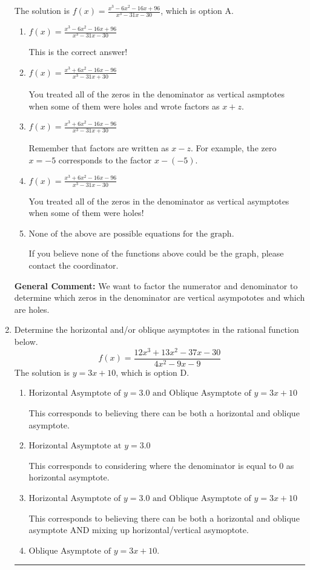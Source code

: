 \documentclass{extbook}[14pt]
\newcommand{\litem}[1]{\item #1

\rule{\textwidth}{0.4pt}}
\begin{document}
\begin{enumerate}
{The solution is \( f(x)=\frac{x^{3} -6 x^{2} -16 x + 96}{x^{3} -31 x -30} \), which is option A.\begin{enumerate}[label=\Alph*.]
\item \( f(x)=\frac{x^{3} -6 x^{2} -16 x + 96}{x^{3} -31 x -30} \)

This is the correct answer!
\item \( f(x)=\frac{x^{3} +6 x^{2} -16 x -96}{x^{3} -31 x + 30} \)

You treated all of the zeros in the denominator as vertical asmptotes when some of them were holes and wrote factors as $x+z$.
\item \( f(x)=\frac{x^{3} +6 x^{2} -16 x -96}{x^{3} -31 x + 30} \)

Remember that factors are written as $x-z$. For example, the zero $x=-5$ corresponds to the factor $x-(-5)$.
\item \( f(x)=\frac{x^{3} +6 x^{2} -16 x -96}{x^{3} -31 x -30} \)

You treated all of the zeros in the denominator as vertical asymptotes when some of them were holes!
\item \( \text{None of the above are possible equations for the graph.} \)

If you believe none of the functions above could be the graph, please contact the coordinator.
\end{enumerate}

\textbf{General Comment:} We want to factor the numerator and denominator to determine which zeros in the denominator are vertical asympototes and which are holes.
}
\litem{
Determine the horizontal and/or oblique asymptotes in the rational function below.
\[ f(x) = \frac{12x^{3} +13 x^{2} -37 x -30}{4x^{2} -9 x -9} \]The solution is \( y = 3x + 10 \), which is option D.\begin{enumerate}[label=\Alph*.]
\item \( \text{Horizontal Asymptote of } y = 3.0 \text{ and Oblique Asymptote of } y = 3x + 10 \)

This corresponds to believing there can be both a horizontal and oblique asymptote.
\item \( \text{Horizontal Asymptote at } y = 3.0 \)

This corresponds to considering where the denominator is equal to 0 as horizontal asymptote.
\item \( \text{Horizontal Asymptote of } y = 3.0 \text{ and Oblique Asymptote of } y = 3x + 10 \)

This corresponds to believing there can be both a horizontal and oblique asymptote AND mixing up horizontal/vertical asymoptote.
\item \( \text{Oblique Asymptote of } y = 3x + 10. \)


\end{enumerate}}
\end{enumerate}
\end{document}
